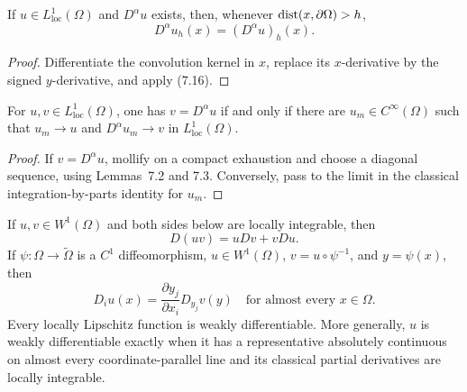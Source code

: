 \begin{lemma}
\label{gt:lem-sobolev-mollifier-derivative}
If $u\in L^1_{\mathrm{loc}}(\Omega)$ and $D^\alpha u$ exists, then, whenever
$\operatorname{dist}(x,\partial\Omega)>h$,
\begin{equation}
\tag{7.17}
D^\alpha u_h(x)=(D^\alpha u)_h(x).
\end{equation}
\end{lemma}
\begin{proof}
\sketch Differentiate the convolution kernel in $x$, replace its
$x$-derivative by the signed $y$-derivative, and apply (7.16).
\end{proof}

\begin{theorem}
\label{gt:thm-sobolev-weak-derivative-approx}
For $u,v\in L^1_{\mathrm{loc}}(\Omega)$, one has $v=D^\alpha u$ if and only
if there are $u_m\in C^\infty(\Omega)$ such that
$u_m\to u$ and $D^\alpha u_m\to v$ in $L^1_{\mathrm{loc}}(\Omega)$.
\end{theorem}
\begin{proof}
\sketch If $v=D^\alpha u$, mollify on a compact exhaustion and choose a
diagonal sequence, using Lemmas~7.2 and 7.3. Conversely, pass to the limit in
the classical integration-by-parts identity for $u_m$.
\end{proof}

\begin{proposition}
\label{gt:prop-sobolev-weak-calculus}
If $u,v\in W^1(\Omega)$ and both sides below are locally integrable, then
\begin{equation}
\tag{7.18}
D(uv)=uDv+vDu.
\end{equation}
If $\psi:\Omega\to\widetilde\Omega$ is a $C^1$ diffeomorphism,
$u\in W^1(\Omega)$, $v=u\circ\psi^{-1}$, and $y=\psi(x)$, then
\begin{equation}
\tag{7.19}
D_i u(x)=\frac{\partial y_j}{\partial x_i}D_{y_j}v(y)
\quad\text{for almost every }x\in\Omega.
\end{equation}
Every locally Lipschitz function is weakly differentiable. More generally,
$u$ is weakly differentiable exactly when it has a representative absolutely
continuous on almost every coordinate-parallel line and its classical partial
derivatives are locally integrable.
\end{proposition}

